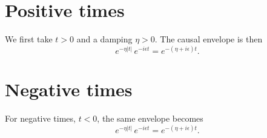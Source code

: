 \documentclass{article}
\begin{document}
\section{Positive times}
We first take $t>0$ and a damping $\eta>0$. The causal envelope is then
\begin{equation}
e^{-\eta|t|}\,e^{-i\epsilon t} = e^{-(\eta+i\epsilon)t} .
\label{eq:pos}
\end{equation}
\section{Negative times}
For negative times, $t<0$, the same envelope becomes
\begin{equation}
e^{-\eta|t|}\,e^{-i\epsilon t} = e^{-(\eta+i\epsilon)t} .
\label{eq:neg}
\end{equation}
\end{document}
